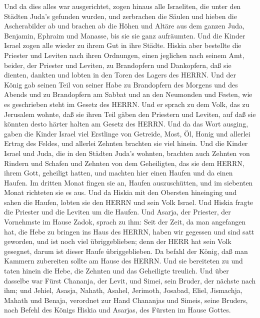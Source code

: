  Und da dies alles war ausgerichtet, zogen hinaus alle
Israeliten, die unter den Städten Juda's gefunden wurden, und zerbrachen
die Säulen und hieben die Ascherabilder ab und brachen ab die Höhen und
Altäre aus dem ganzen Juda, Benjamin, Ephraim und Manasse, bis sie sie
ganz aufräumten. Und die Kinder Israel zogen alle wieder zu ihrem Gut in
ihre Städte.  Hiskia aber bestellte die Priester und Leviten
nach ihren Ordnungen, einen jeglichen nach seinem Amt, beider, der
Priester und Leviten, zu Brandopfern und Dankopfern, daß sie dienten,
dankten und lobten in den Toren des Lagers des HERRN.  Und
der König gab seinen Teil von seiner Habe zu Brandopfern des Morgens und
des Abends und zu Brandopfern am Sabbat und an den Neumonden und Festen,
wie es geschrieben steht im Gesetz des HERRN.  Und er sprach
zu dem Volk, das zu Jerusalem wohnte, daß sie ihren Teil gäben den
Priestern und Leviten, auf daß sie könnten desto härter halten am Gesetz
des HERRN.  Und da das Wort ausging, gaben die Kinder Israel
viel Erstlinge von Getreide, Most, Öl, Honig und allerlei Ertrag des
Feldes, und allerlei Zehnten brachten sie viel hinein.  Und
die Kinder Israel und Juda, die in den Städten Juda's wohnten, brachten
auch Zehnten von Rindern und Schafen und Zehnten von dem Geheiligten,
das sie dem HERRN, ihrem Gott, geheiligt hatten, und machten hier einen
Haufen und da einen Haufen.  Im dritten Monat fingen sie an,
Haufen auszuschütten, und im siebenten Monat richteten sie es aus.
 Und da Hiskia mit den Obersten hineinging und sahen die
Haufen, lobten sie den HERRN und sein Volk Israel.  Und
Hiskia fragte die Priester und die Leviten um die Haufen. 
Und Asarja, der Priester, der Vornehmste im Hause Zadok, sprach zu ihm:
Seit der Zeit, da man angefangen hat, die Hebe zu bringen ins Haus des
HERRN, haben wir gegessen und sind satt geworden, und ist noch viel
übriggeblieben; denn der HERR hat sein Volk gesegnet, darum ist dieser
Haufe übriggeblieben.  Da befahl der König, daß man Kammern
zubereiten sollte am Hause des HERRN. Und sie bereiteten zu
 und taten hinein die Hebe, die Zehnten und das Geheiligte
treulich. Und über dasselbe war Fürst Chananja, der Levit, und Simei,
sein Bruder, der nächste nach ihm;  und Jehiel, Asasja,
Nahath, Asahel, Jerimoth, Josabad, Eliel, Jismachja, Mahath und Benaja,
verordnet zur Hand Chananjas und Simeis, seine Bruders, nach Befehl des
Königs Hiskia und Asarjas, des Fürsten im Hause Gottes. 
